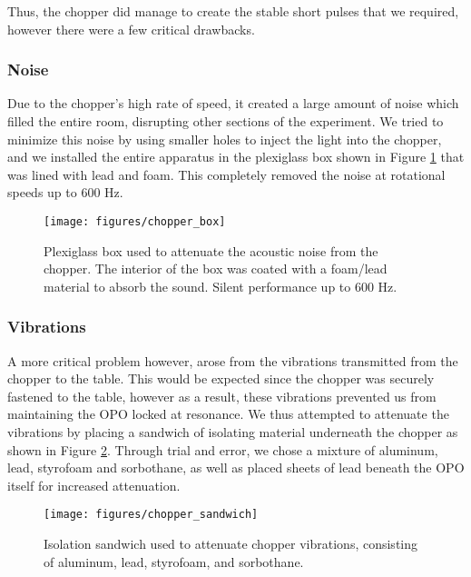 \clearpage

Thus, the chopper did manage to create the stable short pulses that we required, however there were a few critical drawbacks.
\subsubsection{Noise}

Due to the chopper's high rate of speed, it created a large amount of noise which filled the entire room, disrupting other sections of the experiment.  We tried to minimize this noise by using smaller holes to inject the light into the chopper, and we installed the entire apparatus in the plexiglass box shown in Figure \ref{fig:chopper_box} that was lined with lead and foam.  This completely removed the noise at rotational speeds up to 600 Hz.

\begin{figure}[ht] 
 \centering 
 \texttt{[image: figures/chopper\_box]} 
 \caption[Acoustic isolation box for dampening chopper noise]{Plexiglass box used to attenuate the acoustic noise from the chopper.  The interior of the box was coated with a foam/lead material to absorb the sound.  Silent performance up to 600 Hz.} 
 \label{fig:chopper_box} 
\end{figure}

 
\subsubsection{Vibrations}
\label{vibrations} 

A more critical problem however, arose from the vibrations transmitted from the chopper to the table.  This would be expected since the chopper was securely fastened to the table, however as a result, these vibrations prevented us from maintaining the OPO locked at resonance.  We thus attempted to attenuate the vibrations by placing a sandwich of isolating material underneath the chopper as shown in Figure \ref{fig:chopper_sandwich}.  Through trial and error, we chose a mixture of aluminum, lead, styrofoam and sorbothane, as well as placed sheets of lead beneath the OPO itself for increased attenuation.


\begin{figure}[!hbt] 
 \centering 
 \texttt{[image: figures/chopper\_sandwich]} 
 \caption[Chopper vibration isolation stack]{Isolation sandwich used to attenuate chopper vibrations, consisting of aluminum, lead, styrofoam, and sorbothane.} 
 \label{fig:chopper_sandwich}  
\end{figure}
   
